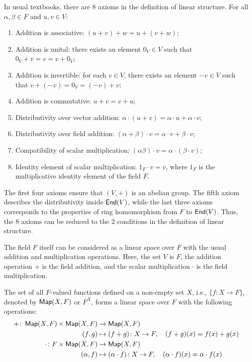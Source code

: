 In usual textbooks, there are 8 axioms in the definition of linear structure. For all $\alpha, \beta \in F$ and $u, v \in V$:
\begin{enumerate}[label=\arabic*.]
  \item Addition is associative: $(u + v) + w = u + (v + w)$;
  \item Addition is unital: there exists an element $0_V \in V$ such that $0_V + v = v = v + 0_V$;
  \item Addition is invertible: for each $v \in V$, there exists an element $-v \in V$ such that $v + (-v) = 0_V = (-v) + v$;
  \item Addition is commutative: $u + v = v + u$;
  \item Distributivity over vector addition: $\alpha \cdot (u + v) = \alpha \cdot u + \alpha \cdot v$;
  \item Distributivity over field addition: $(\alpha + \beta) \cdot v = \alpha \cdot v + \beta \cdot v$;
  \item Compatibility of scalar multiplication: $(\alpha \beta) \cdot v = \alpha \cdot (\beta \cdot v)$;
  \item Identity element of scalar multiplication: $1_F \cdot v = v$, where $1_F$ is the multiplicative identity element of the field $F$.
\end{enumerate}
The first four axioms ensure that $(V, +)$ is an abelian group. The fifth axiom describes the distributivity inside $\operatorname{\text{\normalfont\sffamily End}}(V)$, while the last three axioms corresponds to the properties of ring homomorphism from $F$ to $\operatorname{\text{\normalfont\sffamily End}}(V)$. Thus, the 8 axioms can be reduced to the 2 conditions in the definition of linear structure.

\begin{example}
  The field $F$ itself can be considered as a linear space over $F$ with the usual addition and multiplication operations. Here, the set $V$ is $F$, the addition operation $+$ is the field addition, and the scalar multiplication $\cdot$ is the field multiplication.
\end{example}

\begin{example}\label{ex:function_space}
  The set of all $F$-valued functions defined on a non-empty set $X$, i.e., $\{ f \colon X \to F \}$, denoted by $\operatorname{\text{\normalfont\sffamily Map}}(X, F)$ or $F^X$, forms a linear space over $F$ with the following operations:
  \begin{align*}
    + \colon \operatorname{\text{\normalfont\sffamily Map}}(X, F) \times \operatorname{\text{\normalfont\sffamily Map}}(X, F) & \to \operatorname{\text{\normalfont\sffamily Map}}(X, F)                                                                    \\
    (f, g)                           & \mapsto (f + g) \colon X \to F, \quad (f + g)(x) = f(x) + g(x)                         \\
    \cdot \colon F \times \operatorname{\text{\normalfont\sffamily Map}}(X, F)      & \to \operatorname{\text{\normalfont\sffamily Map}}(X, F)                                                                    \\
    (\alpha, f)                      & \mapsto (\alpha \cdot f) \colon X \to F, \quad (\alpha \cdot f)(x) = \alpha \cdot f(x)
  \end{align*}
\end{example}

